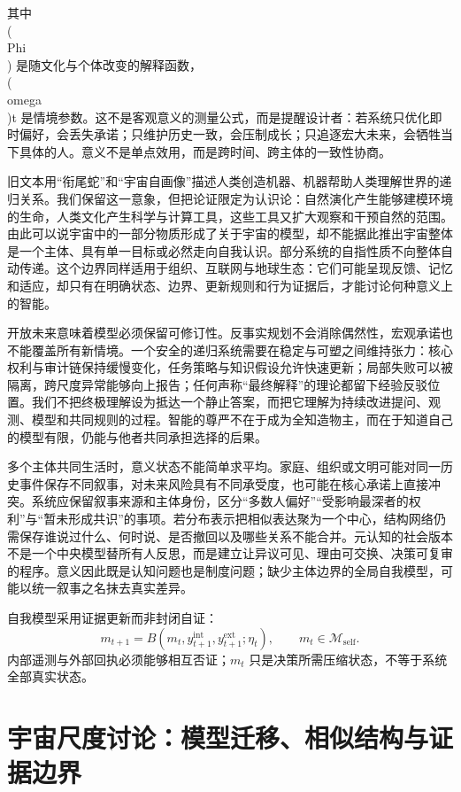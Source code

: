 其中 \\(\\Phi\\) 是随文化与个体改变的解释函数，\\(\\omega\\)t 是情境参数。这不是客观意义的测量公式，而是提醒设计者：若系统只优化即时偏好，会丢失承诺；只维护历史一致，会压制成长；只追逐宏大未来，会牺牲当下具体的人。意义不是单点效用，而是跨时间、跨主体的一致性协商。

旧文本用“衔尾蛇”和“宇宙自画像”描述人类创造机器、机器帮助人类理解世界的递归关系。我们保留这一意象，但把论证限定为认识论：自然演化产生能够建模环境的生命，人类文化产生科学与计算工具，这些工具又扩大观察和干预自然的范围。由此可以说宇宙中的一部分物质形成了关于宇宙的模型，却不能据此推出宇宙整体是一个主体、具有单一目标或必然走向自我认识。部分系统的自指性质不向整体自动传递。这个边界同样适用于组织、互联网与地球生态：它们可能呈现反馈、记忆和适应，却只有在明确状态、边界、更新规则和行为证据后，才能讨论何种意义上的智能。

开放未来意味着模型必须保留可修订性。反事实规划不会消除偶然性，宏观承诺也不能覆盖所有新情境。一个安全的递归系统需要在稳定与可塑之间维持张力：核心权利与审计链保持缓慢变化，任务策略与知识假设允许快速更新；局部失败可以被隔离，跨尺度异常能够向上报告；任何声称“最终解释”的理论都留下经验反驳位置。我们不把终极理解设为抵达一个静止答案，而把它理解为持续改进提问、观测、模型和共同规则的过程。智能的尊严不在于成为全知造物主，而在于知道自己的模型有限，仍能与他者共同承担选择的后果。

多个主体共同生活时，意义状态不能简单求平均。家庭、组织或文明可能对同一历史事件保存不同叙事，对未来风险具有不同承受度，也可能在核心承诺上直接冲突。系统应保留叙事来源和主体身份，区分“多数人偏好”“受影响最深者的权利”与“暂未形成共识”的事项。若分布表示把相似表达聚为一个中心，结构网络仍需保存谁说过什么、何时说、是否撤回以及哪些关系不能合并。元认知的社会版本不是一个中央模型替所有人反思，而是建立让异议可见、理由可交换、决策可复审的程序。意义因此既是认知问题也是制度问题；缺少主体边界的全局自我模型，可能以统一叙事之名抹去真实差异。

自我模型采用证据更新而非封闭自证：
\begin{equation}
m_{t+1}=B(m_t,y^{\mathrm{int}}_{t+1},y^{\mathrm{ext}}_{t+1};\eta_t),\qquad m_t\in\mathcal M_{\mathrm{self}}.
\end{equation}
内部遥测与外部回执必须能够相互否证；$m_t$ 只是决策所需压缩状态，不等于系统全部真实状态。

\section{宇宙尺度讨论：模型迁移、相似结构与证据边界}

